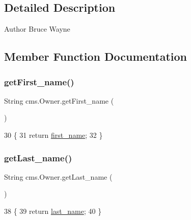 \subsection{Detailed Description}
\begin{DoxyAuthor}{Author}
Bruce Wayne 
\end{DoxyAuthor}


\subsection{Member Function Documentation}
\mbox{\label{classcms_1_1_owner_ad41e0dae9e90756dd8ed05f1814aa9d9}} 
\subsubsection{\texorpdfstring{get\+First\+\_\+name()}{getFirst\_name()}}
{\footnotesize\ttfamily String cms.\+Owner.\+get\+First\+\_\+name (\begin{DoxyParamCaption}{ }\end{DoxyParamCaption})\hspace{0.3cm}{\ttfamily [inline]}}


\begin{DoxyCode}
30                                   \{
31         \textcolor{keywordflow}{return} \mbox{\hyperlink{classcms_1_1_owner_a1cae339c355e6861c6d257004a654b1c}{first\_name}};
32     \}
\end{DoxyCode}
\mbox{\label{classcms_1_1_owner_a7891858f4cd95eee2813af923ad907f1}} 
\subsubsection{\texorpdfstring{get\+Last\+\_\+name()}{getLast\_name()}}
{\footnotesize\ttfamily String cms.\+Owner.\+get\+Last\+\_\+name (\begin{DoxyParamCaption}{ }\end{DoxyParamCaption})\hspace{0.3cm}{\ttfamily [inline]}}


\begin{DoxyCode}
38                                  \{
39         \textcolor{keywordflow}{return} \mbox{\hyperlink{classcms_1_1_owner_a0e60226c1b9f367b9fcff9e41adece5e}{last\_name}};
40     \}
\end{DoxyCode}
\mbox{\label{classcms_1_1_owner_a0e8efb657a36696ad36e06eb0788b13d}} 
